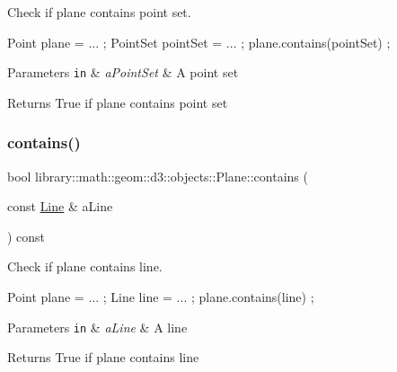 Check if plane contains point set. 


\begin{DoxyCode}
Point plane = ... ;
PointSet pointSet = ... ;
plane.contains(pointSet) ;
\end{DoxyCode}



\begin{DoxyParams}[1]{Parameters}
\mbox{\tt in}  & {\em a\+Point\+Set} & A point set \\
\hline
\end{DoxyParams}
\begin{DoxyReturn}{Returns}
True if plane contains point set 
\end{DoxyReturn}
\mbox{\label{classlibrary_1_1math_1_1geom_1_1d3_1_1objects_1_1_plane_a163c79cd6e5ece9048fff99d42168c6b}} 
\subsubsection{\texorpdfstring{contains()}{contains()}\hspace{0.1cm}{\footnotesize\ttfamily [3/5]}}
{\footnotesize\ttfamily bool library\+::math\+::geom\+::d3\+::objects\+::\+Plane\+::contains (\begin{DoxyParamCaption}\item[{const \hyperlink{classlibrary_1_1math_1_1geom_1_1d3_1_1objects_1_1_line}{Line} \&}]{a\+Line }\end{DoxyParamCaption}) const}



Check if plane contains line. 


\begin{DoxyCode}
Point plane = ... ;
Line line = ... ;
plane.contains(line) ;
\end{DoxyCode}



\begin{DoxyParams}[1]{Parameters}
\mbox{\tt in}  & {\em a\+Line} & A line \\
\hline
\end{DoxyParams}
\begin{DoxyReturn}{Returns}
True if plane contains line 
\end{DoxyReturn}
\mbox{\label{classlibrary_1_1math_1_1geom_1_1d3_1_1objects_1_1_plane_a35e77c2b5c77b2d1b640865cf374d94c}} 
